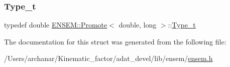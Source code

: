 \subsubsection{\texorpdfstring{Type\_t}{Type\_t}\hspace{0.1cm}{\footnotesize\ttfamily [2/2]}}
{\footnotesize\ttfamily typedef double \mbox{\hyperlink{structENSEM_1_1Promote}{E\+N\+S\+E\+M\+::\+Promote}}$<$ double, long $>$\+::\mbox{\hyperlink{structENSEM_1_1Promote_3_01double_00_01long_01_4_ab38f2aa99a29d60ef8d3393a5fe7d568}{Type\+\_\+t}}}



The documentation for this struct was generated from the following file\+:\begin{DoxyCompactItemize}
\item 
/\+Users/archanar/\+Kinematic\+\_\+factor/adat\+\_\+devel/lib/ensem/\mbox{\hyperlink{lib_2ensem_2ensem_8h}{ensem.\+h}}\end{DoxyCompactItemize}

